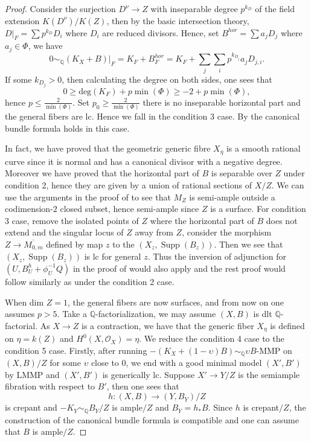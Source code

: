 \documentclass[letterpaper,reqno,12pt]{amsart}
\DeclareMathOperator{\Supp}{Supp}
\numberwithin{equation}{section}
\theoremstyle{plain}
\begin{document}
\begin{proof}
    Consider the surjection $D^\nu\to Z$ with inseparable degree $p^{k_D}$ of the field extension $K(D^\nu)/K(Z)$, then by the basic intersection theory, $D|_F=\sum p^{k_D} D_i$ where $D_i$ are reduced divisors. Hence, set $B^{hor}=\sum a_jD_j$ where $a_j\in \Phi$, we have \[0\sim_{\mathbb Q} (K_X+B)|_F=K_F+B^{hor}_F=K_F+\sum_j\sum_ip^{k_{D_j}}a_jD_{j,i}.\] If some $k_{D_j}>0$, then calculating the degree on both sides, one sees that \[0\geq \text{deg}(K_F)+p\min(\Phi)\geq-2+p\min(\Phi),\] hence $p\leq \frac{2}{\min(\Phi)}$. Set $p_0\geq\frac{2}{\min(\Phi)}$ there is no inseparable horizontal part and the general fibers are lc. Hence we fall in the condition 3 case. By \cite{Witaszek2017OnTC} the canonical bundle formula holds in this case. 
        
    In fact,  we have proved that the geometric generic fibre $X_{\bar{\eta}}$ is a smooth rational curve since it is normal and has a canonical divisor with a negative degree. Moreover we have proved that the horizontal part of $B$ is separable over $Z$ under condition 2, hence they are given by a union of rational sections of $X/Z$. We can use the arguments in the proof of \cite[3.1]{Witaszek2017OnTC} to see that $M_Z$ is semi-ample outside a codimension-$2$ closed subset, hence semi-ample since $Z$ is a surface. For condition 3 case, remove the isolated points of $Z$ where the horizontal part of $B$ does not extend and the singular locus of $Z$ away from $Z$, consider the morphism $Z\to \overline{M_{0,m}}$ defined by map $z$ to the $(X_z,\Supp(B_z))$. Then we see that $(X_z,\Supp(B_z))$ is lc for general $z$. Thus the inversion of adjunction for $(U,B^h_U+\phi_U^{-1}Q)$ in the proof of \cite[3.1]{Witaszek2017OnTC} would also apply and the rest proof would follow similarly as under the condition 2 case.
        
    When dim $Z=1$, the general fibers are now surfaces, and from now on one assumes $p>5$. Take a ${\mathbb Q}$-factorialization, we may assume $(X,B)$ is dlt ${\mathbb Q}$-factorial. As $X\to Z$ is a contraction, we have that the generic fiber $X_\eta$ is defined on $\eta=k(Z)$ and $H^0(X,\mathcal O_X)=\eta$. We reduce the condition 4 case to the condition 5 case. Firstly, after running $-(K_X+(1-\upsilon)B)\sim_{\mathbb Q}\upsilon B$-MMP on $(X,B)/Z$ for some $\upsilon$ close to $0$, we end with a good minimal model $(X',B')$ by LMMP and $(X',B')$ is generically lc. Suppose $X'\to Y/Z$ is the semiample fibration with respect to $B'$, then one sees that \[h:(X,B)\to (Y,B_Y)/Z\] is crepant and $-K_Y\sim_{\mathbb Q}B_Y/Z$ is ample$/Z$ and $B_Y=h_*B$. Since $h$ is crepant$/Z$, the construction of the canonical bundle formula is compatible and one can assume that $B$ is ample$/Z$.


\end{proof}
\end{document}
